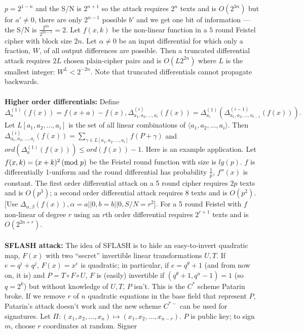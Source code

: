$p=2^{1-n}$ and the S/N is $2^{n+1}$ so the attack requires $2^{n}$ texts
and is $O(2^{3n})$ but for $a' \ne 0$, there are only
$2^{n-1}$ possible $b'$ and we get one bit of information --- the S/N is 
${\frac {2^{2n}} {2^{2n-1}}}=2$.  Let $f(x,k)$ be the non-linear function
in a $5$ round Feistel cipher with block size $2n$.  Let  $\alpha \ne 0$
be an input differential for which only a fraction, $W$, of all output
differences are possible.  Then a truncated differential attack requires
$2L$ chosen plain-cipher pairs and is $O(L 2^{2n})$ where $L$ is the smallest
integer: $W^L < 2^{-2n}$.
Note that truncated differentials cannot propagate backwards.
\\
\\
{\bf Higher order differentials:}  Define 
$$\Delta_a^{(1)}(f(x))= f(x+a)-f(x),
\Delta_{a_1, a_2, \ldots, a_i}^{(i)}(f(x))= 
\Delta_{a_i}^{(1)}( \Delta_{a_1, a_2, \ldots, a_{i-1}}^{(i-1)}(f(x))).$$
Let $L[a_1 , a_2, \ldots, a_i]$ is the set of all linear combinations
of $\langle a_1 , a_2, \ldots, a_i \rangle$.  Then
$\Delta_{a_1, a_2, \ldots, a_i}^{(i)}(f(x))= \sum_{\gamma \in L[ a_1, a_2, \ldots , a_i]}
f(P+ \gamma)$ and
$ord(\Delta_a^{(1)}(f(x))) \le ord(f(x))-1$.
Here is an example application.  Let $f(x,k)= (x+k)^2 \thinspace \textnormal{(mod } p \textnormal{)}$ be the Feistel round
function with size is $lg(p)$. $f$ is differentially 1-uniform and the round
differential has probability ${\frac 1 p}$,  $f''(x)$ is constant.  The first order
differential attack on a 5 round cipher requires $2p$ texts and is $O(p^3)$;
a second order differential attack requires $8$ texts and is $O(p^2)$. [Use
$\Delta_{\alpha , \beta}(f(x)), \alpha= a || 0, b= b ||0, S/N=r^2$].  For a
5 round Feistel with $f$ non-linear of degree $r$ using an $r$th order differential
requires $2^{r+1}$ texts and is $O(2^{2n+r})$.
\\
\\
{\bf SFLASH attack:} The idea of SFLASH is to hide an easy-to-invert quadratic map,
$F(x)$ with two ``secret'' invertible linear transformations $U, T$.  If
$e=q^i+q^j$, $F(x)= x^e$ is quadratic; in particular, if
$e= q^{\theta}+1$ (and from now on, it is)
and $P= T \circ F \circ U$, $F$ is (easily) invertible if $(q^{\theta}+1, q^n-1)=1$ (so
$q=2^k$) but without knowledge of $U, T$, $P$ isn't.  This is the $C^*$ scheme
Patarin broke.  If we remove $r$ of $n$ quadratic equations in the base field
that represent $P$, Patarin's attack
doesn't work and the new scheme $C^{*-}$ can be used for signatures.
Let $\Pi: (x_1 , x_2 , \ldots , x_n) \mapsto (x_1 , x_2 , \ldots ,x_{n-r})$.
$P$ is public key; to sign $m$, choose $r$ coordinates at random.  Signer
